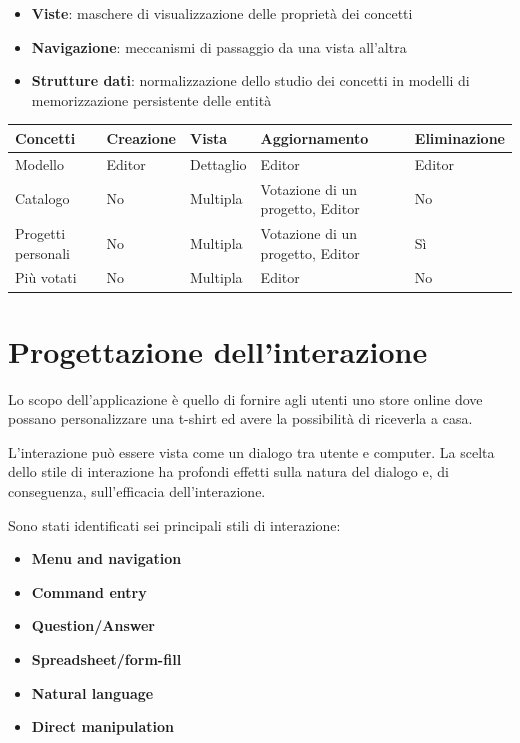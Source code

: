 \documentclass[12pt,italian,]{report}
\providecommand{\tightlist}{%
  \setlength{\itemsep}{0pt}\setlength{\parskip}{0pt}}
\begin{document}
\begin{itemize}
\tightlist
\item
  \textbf{Viste}: maschere di visualizzazione delle proprietà dei
  concetti
\item
  \textbf{Navigazione}: meccanismi di passaggio da una vista all'altra
\item
  \textbf{Strutture dati}: normalizzazione dello studio dei concetti in
  modelli di memorizzazione persistente delle entità
\end{itemize}

\begin{longtable}[]{lllll}
\toprule
Concetti & Creazione & Vista & Aggiornamento &
Eliminazione\tabularnewline
\midrule
\endhead
Modello & Editor & Dettaglio & Editor & Editor\tabularnewline
Catalogo & No & Multipla & Votazione di un progetto, Editor & No\tabularnewline
Progetti personali & No & Multipla & Votazione di un progetto, Editor & Sì\tabularnewline
Più votati & No & Multipla & Editor & No\tabularnewline
\bottomrule
\end{longtable}

\hypertarget{progettazione-dellinterazione}{%
\section{Progettazione
dell'interazione}\label{progettazione-dellinterazione}}

Lo scopo dell'applicazione è quello di fornire agli utenti uno store
online dove possano personalizzare una t-shirt ed avere la possibilità
di riceverla a casa.

L'interazione può essere vista come un dialogo tra utente e computer. La
scelta dello stile di interazione ha profondi effetti sulla natura del
dialogo e, di conseguenza, sull'efficacia dell'interazione.

Sono stati identificati sei principali stili di interazione:

\begin{itemize}
\tightlist
\item
  \textbf{Menu and navigation}
\item
  \textbf{Command entry}
\item
  \textbf{Question/Answer}
\item
  \textbf{Spreadsheet/form-fill}
\item
  \textbf{Natural language}
\item
  \textbf{Direct manipulation}
\end{itemize}
\end{document}
